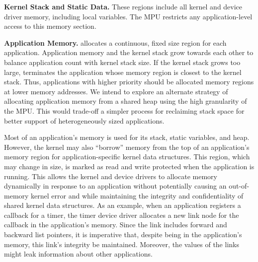{\bf Kernel Stack and Static Data.}
These regions include all kernel and device driver memory, including local
variables. The MPU restricts any application-level access to this memory
section.

{\bf Application Memory.}
\name allocates a continuous, fixed size region for each application.
Application memory and the kernel stack grow towards each other to balance
application count with kernel stack size. If the kernel stack grows too large,
\name terminates the application whose memory region is closest to the kernel
stack. Thus, applications with higher priority should be allocated memory
regions at lower memory addresses. We intend to explore an alternate strategy of
allocating application memory from a shared heap using the high granularity of
the MPU.  This would trade-off a simpler process for reclaiming stack space
for better support of heterogeneously sized applications.


Most of an
application's memory is
used for its stack, static variables, and heap. However,
the kernel may also ``borrow'' memory from the top of an application's memory
region for application-specific kernel data structures. This region, which may
change in size,
is marked
as read and write protected when the application is running. This allows the
kernel and device drivers to allocate memory dynamically in response to an
application without
potentially causing an out-of-memory kernel error and while
maintaining the integrity and
confidentiality of shared kernel data structures. As an example, when an
application registers a callback for a timer, the timer device driver
allocates a new link node for the callback in the application's memory.
Since the link includes forward and backward list
pointers, it is imperative that, despite being in the application's memory,
this link's integrity be maintained. Moreover, the values of the links might
leak information about other applications.


